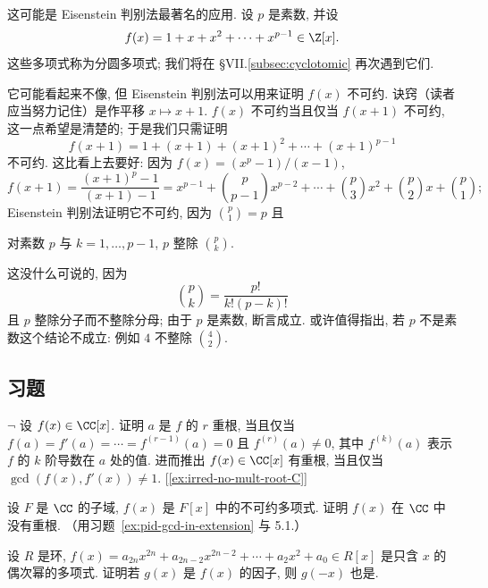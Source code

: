 \begin{example}\label{ex:cyclotomic-eisenstein}
这可能是 Eisenstein 判别法最著名的应用. 设 $p$ 是素数, 并设
\[
f(x)=1+x+x^2+\cdots+x^{p-1}\in\Z[x].
\]
这些多项式称为分圆多项式; 我们将在 \S VII.\ref{subsec:cyclotomic} 再次遇到它们.

它可能看起来不像, 但 Eisenstein 判别法可以用来证明 $f(x)$ 不可约. 诀窍（读者应当努力记住）是作平移 $x\mapsto x+1$. $f(x)$ 不可约当且仅当 $f(x+1)$ 不可约, 这一点希望是清楚的; 于是我们只需证明
\[
f(x+1)=1+(x+1)+(x+1)^2+\cdots+(x+1)^{p-1}
\]
不可约. 这比看上去要好: 因为 $f(x)=(x^p-1)/(x-1)$,
\[
f(x+1)=\frac{(x+1)^p-1}{(x+1)-1}=x^{p-1}+\binom{p}{p-1}x^{p-2}+\cdots+\binom{p}{3}x^2+\binom{p}{2}x+\binom{p}{1};
\]
Eisenstein 判别法证明它不可约, 因为 $\binom{p}{1}=p$ 且
\end{example}

\begin{claim}\label{claim:binom-p-div}
对素数 $p$ 与 $k=1,\ldots,p-1$, $p$ 整除 $\binom{p}{k}$.
\end{claim}

这没什么可说的, 因为
\[
\binom{p}{k}=\frac{p!}{k!(p-k)!}
\]
且 $p$ 整除分子而不整除分母; 由于 $p$ 是素数, 断言成立. 或许值得指出, 若 $p$ 不是素数这个结论不成立: 例如 $4$ 不整除 $\binom{4}{2}$.

\subsection*{习题}
{}

\begin{prob}
\label{ex:mult-root-derivative}
$\neg$ 设 $f(x)\in\CC[x]$. 证明 $a$ 是 $f$ 的 $r$ 重根, 当且仅当 $f(a)=f'(a)=\cdots=f^{(r-1)}(a)=0$ 且 $f^{(r)}(a)\neq 0$, 其中 $f^{(k)}(a)$ 表示 $f$ 的 $k$ 阶导数在 $a$ 处的值. 进而推出 $f(x)\in\CC[x]$ 有重根, 当且仅当 $\gcd(f(x),f'(x))\neq 1$. [\ref{ex:irred-no-mult-root-C}]
\end{prob}

\begin{prob}
\label{ex:irred-no-mult-root-C}
设 $F$ 是 $\CC$ 的子域, $f(x)$ 是 $F[x]$ 中的不可约多项式. 证明 $f(x)$ 在 $\CC$ 中没有重根. （用习题~\ref{ex:pid-gcd-in-extension} 与 5.1.）
\end{prob}

\begin{prob}
\label{ex:even-powers-factor}
设 $R$ 是环, $f(x)=a_{2n}x^{2n}+a_{2n-2}x^{2n-2}+\cdots+a_2x^2+a_0\in R[x]$ 是只含 $x$ 的偶次幂的多项式. 证明若 $g(x)$ 是 $f(x)$ 的因子, 则 $g(-x)$ 也是.
\end{prob}

